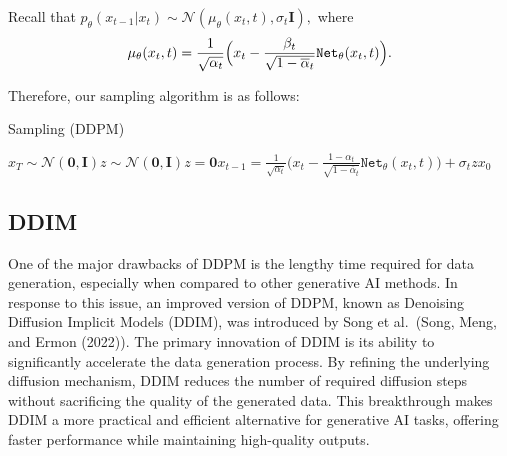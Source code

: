 \documentclass[
]{article}
\theoremstyle{remark}
\begin{document}
Recall that
\(p_{\theta}(x_{t-1}\vert x_t)\sim \mathcal{N}(\mu_{\theta}(x_t,t),\sigma_t \mathbf{I}),\)
where \[
\begin{aligned}
  \mu_{\theta} (x_t,t) = \frac{1}{\sqrt{\alpha_t}} \Bigl( 
    x_t - \frac{\beta_t}{\sqrt{1-\overline{\alpha}_t}} \mathtt{Net}_{\theta} (x_t,t)
    \Bigr).
\end{aligned}
\]

Therefore, our sampling algorithm is as follows:

\begin{algorithm}[H]
\caption{Sampling (DDPM)}
\label{alg-diffusion-model-sampling-shortly}
\begin{algorithmic}[1]
\State $x_T\sim \mathcal{N}(\mathbf{0},\mathbf{I})$\State $z \sim \mathcal{N}(\mathbf{0},\mathbf{I})$\Else\State $z= \mathbf{0}$\EndIf\State $x_{t-1}=\frac{1}{\sqrt{\alpha_t}}\Big(x_t-\frac{1-\alpha_t}{\sqrt{1-\overline{\alpha}_t}}\mathtt{Net}_{\theta}(x_t,t)\Big)+\sigma_t z$\EndFor\Return $x_0$
\end{algorithmic}
\end{algorithm}

\subsection{DDIM}\label{sec-DDIM}

One of the major drawbacks of DDPM is the lengthy time required for data
generation, especially when compared to other generative AI methods. In
response to this issue, an improved version of DDPM, known as Denoising
Diffusion Implicit Models (DDIM), was introduced by Song et al.~(Song,
Meng, and Ermon (2022)). The primary innovation of DDIM is its ability
to significantly accelerate the data generation process. By refining the
underlying diffusion mechanism, DDIM reduces the number of required
diffusion steps without sacrificing the quality of the generated data.
This breakthrough makes DDIM a more practical and efficient alternative
for generative AI tasks, offering faster performance while maintaining
high-quality outputs.
\end{document}
